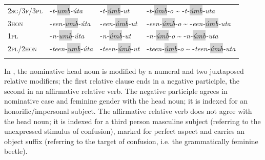 \documentclass[output=paper,colorlinks,citecolor=brown,draftmode
]{langscibook}
\begin{document}
\begin{table}
\begin{tabular}{llll}
\textsc{2sg/3f/3pl} & -\textit{t-\colorbox{lightgray}{umb}-úta} & -\textit{t-\colorbox{lightgray}{úmb}-ut} & -\textit{t-\colorbox{lightgray}{úmb}-o} \~{} -\textit{t-\colorbox{lightgray}{úmb}-uta}\\
\textsc{3hon} & -\textit{een-\colorbox{lightgray}{umb}-úta} & -\textit{een-\colorbox{lightgray}{úmb}-ut} & -\textit{een-\colorbox{lightgray}{úmb}-o} \~{} -\textit{een-\colorbox{lightgray}{úmb}-uta}\\
\textsc{1pl} & -\textit{n-\colorbox{lightgray}{umb}-úta} & -\textit{n-\colorbox{lightgray}{úmb}-ut} & -\textit{n-\colorbox{lightgray}{úmb}-o} \~{} -\textit{n-\colorbox{lightgray}{úmb}-uta} \\
\textsc{2pl/2hon} & -\textit{teen-\colorbox{lightgray}{umb}-úta} & -\textit{teen-\colorbox{lightgray}{úmb}-ut} & -\textit{teen-\colorbox{lightgray}{úmb}-o} \~{} -\textit{teen-\colorbox{lightgray}{úmb}-uta}\\
    \midrule
  \lspbottomrule
 \end{tabular}
\end{table}

In , the nominative head noun is modified by a numeral and two juxtaposed relative modifiers; the first relative clause ends in a negative participle, the second in an affirmative relative verb. The negative participle agrees in nominative case and feminine gender with the head noun; it is indexed for an honorific/impersonal subject. The affirmative relative verb does not agree with the head noun; it is indexed for a third person masculine subject (referring to the unexpressed stimulus of confusion), marked for perfect aspect and carries an object suffix (referring to the target of confusion, i.e. the grammatically feminine beetle).

\end{document}
